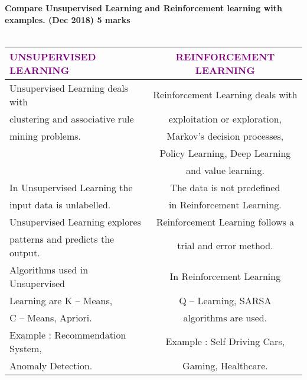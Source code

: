 \textbf{\textcolor{LightMagenta}{Compare Unsupervised Learning and Reinforcement learning with examples. (Dec 2018) \hfill 5 marks}} \\[5pt]
\\
\renewcommand{\arraystretch}{1}
\begin{tabular}{|l|c|}
	\hline \hline
    {\bfseries \textcolor{purple}{UNSUPERVISED LEARNING}}	& {\bfseries \textcolor{purple}{REINFORCEMENT LEARNING}} \\
    \hline
    \hline
     Unsupervised Learning deals with & Reinforcement Learning deals with \\
     clustering and associative rule  & exploitation or exploration, \\
     mining problems. &  Markov’s decision processes, \\
     & Policy Learning, Deep Learning \\
     &  and value learning. \\
    \hline
   In Unsupervised Learning the &  The data is not predefined \\
   input data is unlabelled. & in Reinforcement Learning. \\
    \hline
    Unsupervised Learning explores & Reinforcement Learning follows a  \\
    patterns and predicts the output. & trial and error method.\\
    \hline
    Algorithms used in Unsupervised & In Reinforcement Learning  \\
    Learning are K – Means, & Q – Learning, SARSA \\
    C – Means, Apriori. & algorithms are used. \\
    \hline
    Example : Recommendation System, & Example : Self Driving Cars, \\
    Anomaly Detection. & Gaming, Healthcare.\\
    \hline
    \hline
   \end{tabular}